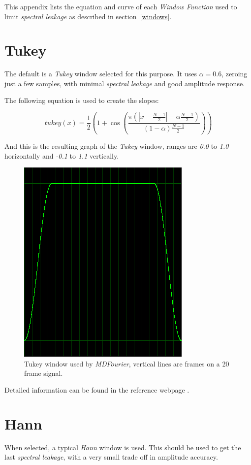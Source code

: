 \documentclass[10pt,a4paper]{report}
\begin{document}
\begin{appendices}
This appendix lists the equation and curve of each \textit{Window Function} used to limit \textit{spectral leakage} as described in section~\ref{windows}.

\section{Tukey}

The default is a \textit{Tukey} window selected for this purpose. It uses $\alpha = 0.6$, zeroing just a few samples, with minimal \textit{spectral leakage} and good amplitude response.

The following equation is used to create the slopes:

\begin{equation}
tukey(x)=\frac{1}{2}(1+\cos(\frac{\pi(|x-\frac{N-1}{2}|-\alpha \frac{N-1}{2})}{(1-\alpha)\frac{N-1}{2}}))
\end{equation}

And this is the resulting graph of the \textit{Tukey} window, ranges are \textit{0.0} to \textit{1.0} horizontally and \textit{-0.1} to \textit{1.1} vertically.

\begin{figure}[H]
	\centering
	\includegraphics[width=0.4\linewidth]{images/windows/window-tukey.png}
	\caption[Tukey Window]{Tukey window used by \textit{MDFourier}, vertical lines are frames on a 20 frame signal.}
	\label{fig:window-tukey}
\end{figure}

Detailed information can be found in the reference webpage \cite{tukey}.

\section{Hann}
When selected, a typical \textit{Hann} window is used. This should be used to get the last \textit{spectral leakage}, with a very small trade off in amplitude accuracy.


\end{appendices}
\end{document}
